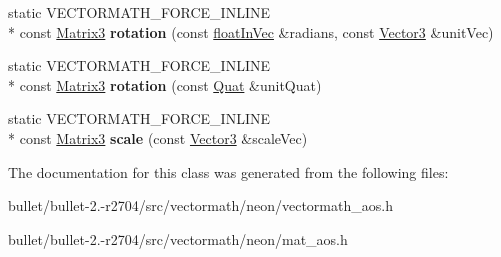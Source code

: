 \begin{DoxyCompactItemize}
\item 
\hypertarget{class_vectormath_1_1_aos_1_1_matrix3_a3e012c647f58c8bd92fe8ce8950ab5b6}{static V\+E\+C\+T\+O\+R\+M\+A\+T\+H\+\_\+\+F\+O\+R\+C\+E\+\_\+\+I\+N\+L\+I\+N\+E \\*
const \hyperlink{class_vectormath_1_1_aos_1_1_matrix3}{Matrix3} {\bfseries rotation} (const \hyperlink{class_vectormath_1_1float_in_vec}{float\+In\+Vec} \&radians, const \hyperlink{class_vectormath_1_1_aos_1_1_vector3}{Vector3} \&unit\+Vec)}\label{class_vectormath_1_1_aos_1_1_matrix3_a3e012c647f58c8bd92fe8ce8950ab5b6}

\item 
\hypertarget{class_vectormath_1_1_aos_1_1_matrix3_a1089e04865b25cfecd7f822e98c47aaa}{static V\+E\+C\+T\+O\+R\+M\+A\+T\+H\+\_\+\+F\+O\+R\+C\+E\+\_\+\+I\+N\+L\+I\+N\+E \\*
const \hyperlink{class_vectormath_1_1_aos_1_1_matrix3}{Matrix3} {\bfseries rotation} (const \hyperlink{class_vectormath_1_1_aos_1_1_quat}{Quat} \&unit\+Quat)}\label{class_vectormath_1_1_aos_1_1_matrix3_a1089e04865b25cfecd7f822e98c47aaa}

\item 
\hypertarget{class_vectormath_1_1_aos_1_1_matrix3_a5499db3c15a95382e7e79021e15af4a8}{static V\+E\+C\+T\+O\+R\+M\+A\+T\+H\+\_\+\+F\+O\+R\+C\+E\+\_\+\+I\+N\+L\+I\+N\+E \\*
const \hyperlink{class_vectormath_1_1_aos_1_1_matrix3}{Matrix3} {\bfseries scale} (const \hyperlink{class_vectormath_1_1_aos_1_1_vector3}{Vector3} \&scale\+Vec)}\label{class_vectormath_1_1_aos_1_1_matrix3_a5499db3c15a95382e7e79021e15af4a8}

\end{DoxyCompactItemize}


The documentation for this class was generated from the following files\+:\begin{DoxyCompactItemize}
\item 
bullet/bullet-\/2.-\/r2704/src/vectormath/neon/vectormath\+\_\+aos.\+h\item 
bullet/bullet-\/2.-\/r2704/src/vectormath/neon/mat\+\_\+aos.\+h\end{DoxyCompactItemize}
